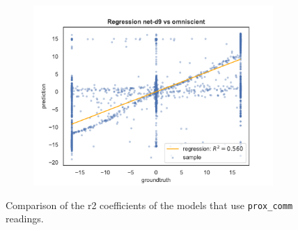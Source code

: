 \begin{figure}[!htb]
\begin{center}
	\end{center}
	\hfil\vspace{-0.8cm}
	\begin{center}
		\begin{subfigure}[h]{0.49\textwidth}
			\includegraphics[width=\textwidth]{contents/images/net-d9/regression-net-d9-vs-omniscient}
		\end{subfigure}
	\end{center}
	\caption[Comparison of the \gls{r2} coefficients for \texttt{prox\_comm} 
	readings.]{Comparison of the \gls{r2} coefficients of the models that use 
		\texttt{prox\_comm} readings.}
	\label{fig:net-d789r2}
\end{figure}

